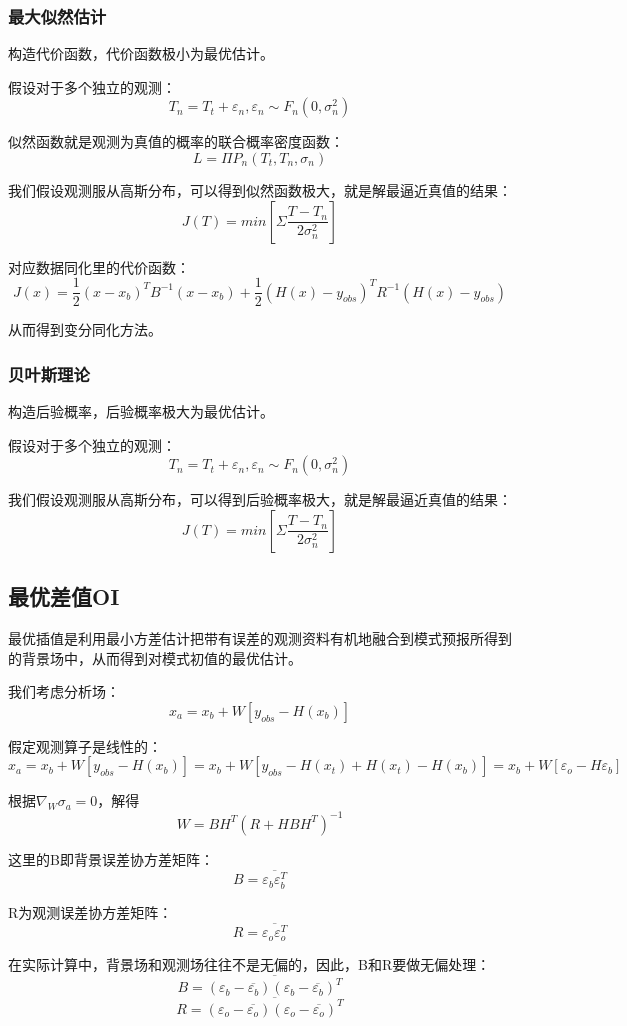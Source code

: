 \documentclass{article}
\begin{document}
\subsubsection{最大似然估计}
构造代价函数，代价函数极小为最优估计。

假设对于多个独立的观测：
$$T_n = T_t + \varepsilon_n, \varepsilon_n\sim F_n(0, \sigma^2_n)$$

似然函数就是观测为真值的概率的联合概率密度函数：
$$L = \Pi P_n(T_t, T_n, \sigma_n)$$

我们假设观测服从高斯分布，可以得到似然函数极大，就是解最逼近真值的结果：
$$J(T) = min[\Sigma \frac{T-T_n}{2\sigma_n^2}]$$

对应数据同化里的代价函数：
$$J(x) = \frac{1}{2}(x-x_b)^{T}B^{-1}(x-x_b) + \frac{1}{2}(H(x)-y_{obs})^{T}R^{-1}(H(x)-y_{obs})$$

从而得到变分同化方法。

\subsubsection{贝叶斯理论}
构造后验概率，后验概率极大为最优估计。

假设对于多个独立的观测：
$$T_n = T_t + \varepsilon_n, \varepsilon_n\sim F_n(0, \sigma^2_n)$$

我们假设观测服从高斯分布，可以得到后验概率极大，就是解最逼近真值的结果：
$$J(T) = min[\Sigma \frac{T-T_n}{2\sigma_n^2}]$$

\subsection{最优差值OI}
最优插值是利用最小方差估计把带有误差的观测资料有机地融合到模式预报所得到的背景场中，从而得到对模式初值的最优估计。

我们考虑分析场：
$$x_a = x_b + W[y_{obs} - H(x_b)]$$

假定观测算子是线性的：
$$x_a = x_b + W[y_{obs} - H(x_b)] =  x_b + W[y_{obs}-H(x_t)+H(x_t)-H(x_b)]=x_b + W[\varepsilon_o-H\varepsilon_b]$$

根据$\nabla_W \sigma_a = 0$，解得
$$W = BH^T(R + HBH^T)^{-1}$$

这里的B即背景误差协方差矩阵：
$$B=\overline{\varepsilon_b\varepsilon_b^T}$$

R为观测误差协方差矩阵：
$$R=\overline{\varepsilon_o\varepsilon_o^T}$$

在实际计算中，背景场和观测场往往不是无偏的，因此，B和R要做无偏处理：
$$B=\overline{(\varepsilon_b-\overline{\varepsilon_b})(\varepsilon_b-\overline{\varepsilon_b})^T}$$
$$R=\overline{(\varepsilon_o-\overline{\varepsilon_o})(\varepsilon_o-\overline{\varepsilon_o})^T}$$
\end{document}
